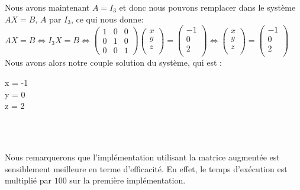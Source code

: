 Nous avons maintenant $A=I_3$ et donc nous pouvons remplacer dans le système $AX=B$, $A$ par $I_3$, ce qui nous donne: \vspace{4pt}\\
$
AX=B \iff I_3X=B
\iff
    \begin{pmatrix}
        1 & 0 & 0\\
        0 & 1 & 0 \\
        0 & 0 & 1
    \end{pmatrix}
    \begin{pmatrix}
    	x \\
		y \\
		z \\
    \end{pmatrix}
    =
    \begin{pmatrix}
    	-1\\
		0 \\
		2 \\
    \end{pmatrix}
    \iff
    \begin{pmatrix}
    	x \\
		y \\
		z \\
    \end{pmatrix}
    =
    \begin{pmatrix}
    	-1\\
		0 \\
		2 \\
    \end{pmatrix}$
\vspace{6pt}\\
Nous avons alors notre couple solution du système, qui est : \vspace{4pt}\\
\begin{System}
  x = -1 \\
  y = 0 \\
  z = 2 
\end{System}\\

\newpage

\newpage

\\
Nous remarquerons que l'implémentation utilisant la matrice augmentée est sensiblement meilleure en terme d'efficacité. En effet, le temps d'exécution est multiplié par $100$ sur la première implémentation.
